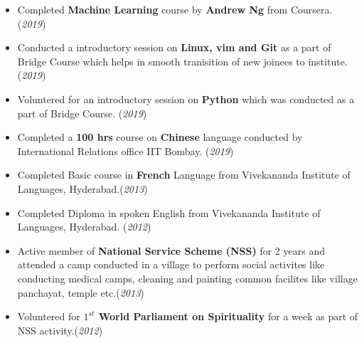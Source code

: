 \documentclass[10pt]{article}
\begin{document}
\colorbox{bl}{}
\vspace{-0.45cm}
\begin{itemize}[leftmargin=0.4cm]
		\item {Completed \textbf{Machine Learning} course by \textbf{Andrew Ng} from Coursera. }\hfill{(\textit{2019})}\vspace{-0.2cm}
	\item {Conducted a introductory session on \textbf{Linux, vim and Git} as a part of Bridge Course which helps in smooth tranisition of new joinees to institute. }\hfill{(\textit{2019})}\vspace{-0.2cm}
	\item {Voluntered for an introductory session on \textbf{Python} which was conducted as a part of Bridge Course.}
	\hfill{(\textit{2019})}\vspace{-0.2cm}
    \item {Completed a \textbf{100 hrs} course on \textbf{Chinese} language conducted by International Relations office IIT Bombay. }\hfill{(\textit{2019})}\vspace{-0.2cm}
    \item {Completed Basic course in \textbf{French} Language from Vivekananda Institute of Languages, Hyderabad.}\hfill{(\textit{2013})}\vspace{-0.2cm}

    \item {Completed Diploma in spoken English from Vivekananda Institute of Languages, Hyderabad.} \hfill{(\textit{2012})}\vspace{-0.2cm}
   \item {Active member of \textbf{National Service Scheme (NSS)} for 2 years and attended a camp conducted in a village to perform social activites like conducting medical camps, cleaning and painting common facilites like village panchayat, temple etc.}\hfill{(\textit{2013})}\vspace{-0.2cm}
   \item {Voluntered for \textbf{$1^{st}$ World Parliament on Spirituality} for a week as part of NSS activity.}\hfill{(\textit{2012})}\vspace{-0.2cm}
    
\end{itemize}

\end{document}

